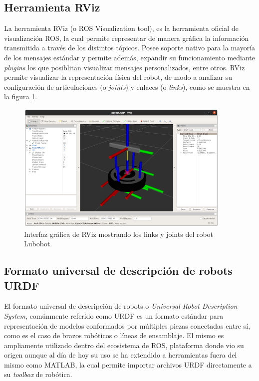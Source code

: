 \subsection{Herramienta RViz}

La herramienta RViz (o ROS Visualization tool), es la herramienta oficial de visualización ROS, la cual permite representar de manera gráfica la información transmitida a través de los distintos tópicos. Posee soporte nativo para la mayoría de los mensajes estándar y permite además, expandir su funcionamiento mediante \textit{plugins} los que posiblitan visualizar mensajes personalizados, entre otros.\newline
RViz permite visualizar la representación física del robot, de modo a analizar su configuración de articulaciones (o \textit{joints}) y enlaces (o \textit{links}), como se muestra en la figura \ref{fig:rviz}.

\begin{figure}[ht]
	\centering
	\includegraphics{./Figures/rviz.png}
	\caption{Interfaz gráfica de RViz mostrando los links y joints del robot Lubobot.}
	\label{fig:rviz}
\end{figure}

\subsection{Formato universal de descripción de robots URDF}

El formato universal de descripción de robots o \textit{Universal Robot Description System}, comúnmente referido como URDF es un formato estándar para representación de modelos conformados por múltiples piezas conectadas entre sí, como es el caso de brazos robóticos o líneas de ensamblaje. El mismo es ampliamente utilizado dentro del ecosistema de ROS, plataforma donde vio su origen aunque al día de hoy su uso se ha extendido a herramientas fuera del mismo como MATLAB, la cual permite importar archivos URDF directamente a su \textit{toolbox} de robótica.

